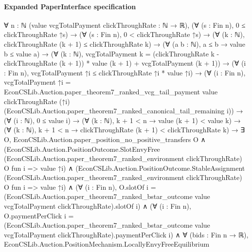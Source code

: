 \documentclass[10pt]{article}
\begin{document}
\paragraph{Expanded PaperInterface specification}
\begin{ReviewVerbatim}
∀ {n : ℕ} (value vcgTotalPayment clickThroughRate : ℕ → ℝ),
  (∀ (s : Fin n), 0 ≤ clickThroughRate ↑s) →
    (∀ (s : Fin n), 0 < clickThroughRate ↑s) →
      (∀ (k : ℕ), clickThroughRate (k + 1) ≤ clickThroughRate k) →
        (∀ (a b : ℕ), a ≤ b → value b ≤ value a) →
          (∀ (k : ℕ),
              vcgTotalPayment k =
                (clickThroughRate k - clickThroughRate (k + 1)) * value (k + 1) + vcgTotalPayment (k + 1)) →
            (∀ (i : Fin n), vcgTotalPayment ↑i ≤ clickThroughRate ↑i * value ↑i) →
              (∀ (i : Fin n),
                  vcgTotalPayment ↑i =
                    EconCSLib.Auction.paper_theorem7_ranked_vcg_tail_payment value clickThroughRate (↑i)
                      (EconCSLib.Auction.paper_theorem7_ranked_canonical_tail_remaining i)) →
                (∀ (i : ℕ), 0 ≤ value i) →
                  (∀ (k : ℕ), k + 1 < n → value (k + 1) < value k) →
                    (∀ (k : ℕ), k + 1 < n → clickThroughRate (k + 1) < clickThroughRate k) →
                      ∃ O,
                        EconCSLib.Auction.paper_position_no_positive_transfers O ∧
                          (EconCSLib.Auction.PositionOutcome.SlotEnvyFree
                              (EconCSLib.Auction.paper_theorem7_ranked_environment clickThroughRate) O fun i =>
                              value ↑i) ∧
                            (EconCSLib.Auction.PositionOutcome.StableAssignment
                                (EconCSLib.Auction.paper_theorem7_ranked_environment clickThroughRate) O fun i =>
                                value ↑i) ∧
                              (∀ (i : Fin n),
                                  O.slotOf i =
                                    (EconCSLib.Auction.paper_theorem7_ranked_bstar_outcome value vcgTotalPayment
                                          clickThroughRate).slotOf
                                      i) ∧
                                (∀ (i : Fin n),
                                    O.paymentPerClick i =
                                      (EconCSLib.Auction.paper_theorem7_ranked_bstar_outcome value vcgTotalPayment
                                            clickThroughRate).paymentPerClick
                                        i) ∧
                                  ∀ (bids : Fin n → ℝ),
                                    EconCSLib.Auction.PositionMechanism.LocallyEnvyFreeEquilibrium

\end{ReviewVerbatim}
\end{document}
